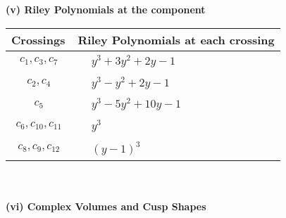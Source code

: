 \documentclass[1p]{elsarticle_modified}
\theoremstyle{definition}
\begin{document}
\newpage\renewcommand{\arraystretch}{1}
\flushleft \textbf{(v) Riley Polynomials at the component}\newline \\
\begin{tabular}{m{50pt}|m{274pt}}
Crossings & \hspace{64pt}Riley Polynomials at each crossing \\
\hline $$\begin{aligned}c_{1},c_{3},c_{7}\end{aligned}$$&$\begin{aligned}
&y^3+3 y^2+2 y-1
\end{aligned}$\\
\hline $$\begin{aligned}c_{2},c_{4}\end{aligned}$$&$\begin{aligned}
&y^3- y^2+2 y-1
\end{aligned}$\\
\hline $$\begin{aligned}c_{5}\end{aligned}$$&$\begin{aligned}
&y^3-5 y^2+10 y-1
\end{aligned}$\\
\hline $$\begin{aligned}c_{6},c_{10},c_{11}\end{aligned}$$&$\begin{aligned}
&y^3
\end{aligned}$\\
\hline $$\begin{aligned}c_{8},c_{9},c_{12}\end{aligned}$$&$\begin{aligned}
&(y-1)^3
\end{aligned}$\\
\hline
\end{tabular}\\~\\
\newpage\flushleft \textbf{(vi) Complex Volumes and Cusp Shapes}
\end{document}

